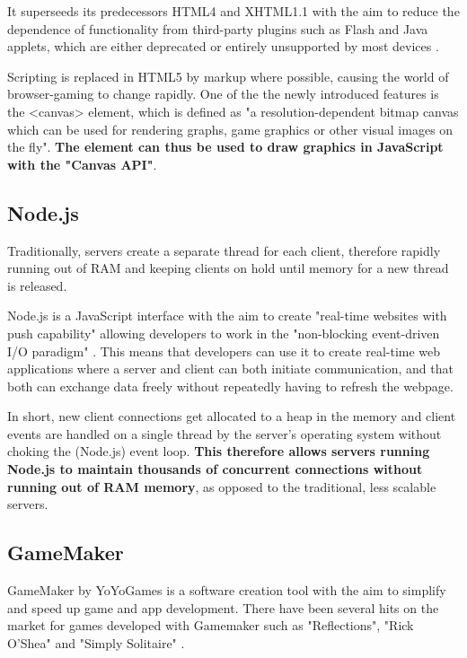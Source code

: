 \documentclass[bsc,frontabs,twoside,singlespacing,parskip,deptreport]{infthesis}     %
\begin{document}
It superseeds its predecessors HTML4 and XHTML1.1 with the aim to reduce the dependence of functionality from third-party plugins such as Flash and Java applets, which are either deprecated or entirely unsupported by most devices \cite{Death_Flash_Java}.

Scripting is replaced in HTML5 by markup where possible, causing the world of browser-gaming to change rapidly. One of the the newly introduced features is the <canvas> element, which is defined as "a resolution-dependent bitmap canvas which can be used for rendering graphs, game graphics or other visual images on the fly"\cite{HTML5_Up_and_Running}. \textbf{The element can thus be used to draw graphics in JavaScript with the "Canvas API"}\cite{Canvas_API}.

\subsection{Node.js}
Traditionally, servers create a separate thread for each client, therefore rapidly running out of RAM and keeping clients on hold until memory for a new thread is released\cite{Why_Nodejs}.

Node.js is a JavaScript interface with the aim to create "real-time websites with push capability" allowing developers to work in the "non-blocking event-driven I/O paradigm" \cite{Why_Nodejs}. This means that developers can use it to create real-time web applications where a server and client can both initiate communication, and that both can exchange data freely without repeatedly having to refresh the webpage.

In short, new client connections get allocated to a heap in the memory and client events are handled on a single thread by the server's operating system without choking the (Node.js) event loop. \textbf{This therefore allows servers running Node.js to maintain thousands of concurrent connections without running out of RAM memory}\cite{Node_Stress_Test}\cite{NodeJS_Image}, as opposed to the traditional, less scalable servers.


\subsection{GameMaker}
GameMaker by YoYoGames is a software creation tool with the aim to simplify and speed up game and app development. There have been several hits on the market for games developed with Gamemaker such as "Reflections", "Rick O'Shea" and "Simply Solitaire" \cite{Gamemaker_DnD}.
\end{document}
